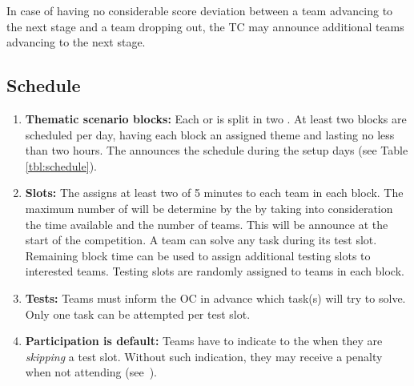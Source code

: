 In case of having no considerable score deviation between a team advancing to the next stage and a team dropping out, the TC may announce additional teams advancing to the next stage.


\subsection{Schedule}
\label{rule:schedule}

\begin{enumerate}
	\item \textbf{Thematic scenario blocks:} Each  or  is split in two .
	At least two blocks are scheduled per day, having each block an assigned theme and lasting no less than two hours.
	The  announces the schedule during the setup days (see Table \ref{tbl:schedule}).

	\item \textbf{Slots:} The  assigns at least two  of 5 minutes to each team in each block.
    The maximum number of  will be determine by the  by taking into consideration the time available and the number of teams. This will be announce at the start of the competition.
	A team can solve any task during its test slot.
	Remaining block time can be used to assign additional testing slots to interested teams.
	Testing slots are randomly assigned to teams in each block.

	\item \textbf{Tests:} Teams must inform the OC in advance which task(s) will try to solve.
	Only one task can be attempted per test slot.

	\item \textbf{Participation is default:} Teams have to indicate to the  when they are \emph{skipping} a test slot. Without such indication, they may receive a penalty when not attending (see~).
\end{enumerate}

